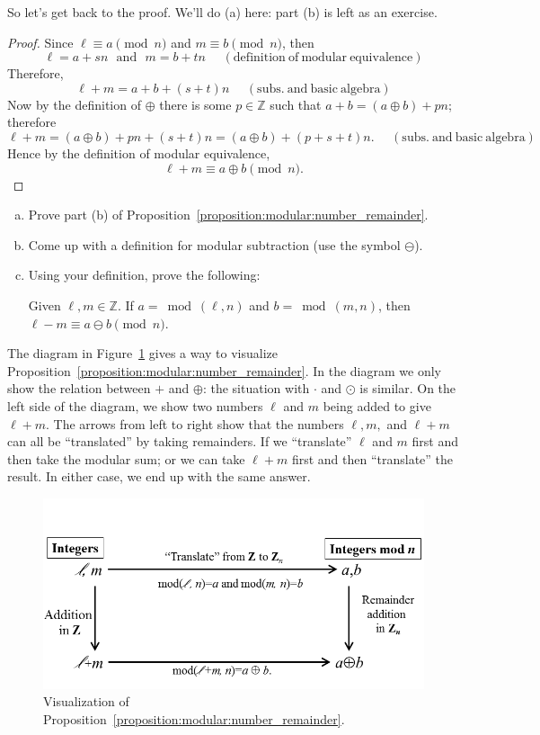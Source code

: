 \noindent
So let's get back to the proof.  We'll do (a) here: part (b) is left as an exercise.

\begin{proof}
Since $\ell \equiv a \pmod{n}$ and $m \equiv b \pmod{n}$, then
\[ \ell = a + sn \mathrm{~~~and~~~} m = b + tn  \mathrm{~~~~~~(definition~of~modular~equivalence)} \]
Therefore, 
\[ \ell + m =a + b + (s + t)n \mathrm{~~~~~~(subs.~and~ basic~algebra)} \]
Now by the definition of $\oplus$ there is some $p \in {\mathbb Z}$ such that  $a + b = (a \oplus b) + pn$; therefore 
\[ \ell + m = (a \oplus b) + pn + (s + t)n = (a \oplus b) + ( p + s + t)n. \mathrm{~~~~~~(subs.~and~ basic~algebra)} \]
Hence by the definition of modular equivalence, 
\[ \ell + m \equiv a \oplus b \pmod{n}. \]
\end{proof}

\begin{exercise}{44}
\begin{enumerate}[(a)]
\item
Prove part (b) of Proposition~\ref{proposition:modular:number_remainder}.
\item
Come up with a definition for modular subtraction (use the symbol $\ominus$).
\item
Using your definition, prove the following:

\noindent
Given $\ell,m \in {\mathbb Z}$. If $a =\bmod(\ell,n)$ and $b=\bmod(m,n)$, then  $\ell - m \equiv a\ominus b \pmod{n}$.
\end{enumerate}
\end{exercise}

The diagram in Figure~\ref{fig:commDiagModular} gives a way to visualize  Proposition~\ref{proposition:modular:number_remainder}.  In the diagram we only show the relation between $+$ and $\oplus$: the situation with $\cdot$ and $\odot$ is similar. On the left side of the diagram, we show two numbers $\ell$ and $m$ being added to give $\ell + m$. The arrows from left to right show that the numbers $\ell, m,$ and $\ell + m$ can all be ``translated'' by taking remainders. If we ``translate'' $\ell$ and $m$ first and then take the modular sum; or we can take $\ell + m$ first and then ``translate'' the result. In either case, we end up with the same answer.

\begin{figure}[h]
\begin{center}
\includegraphics[width=4.5in]{images/CommDiagModAdd.png}
\end{center}
\caption{Visualization of Proposition~\ref{proposition:modular:number_remainder}.\label{fig:commDiagModular}}
\end{figure}


